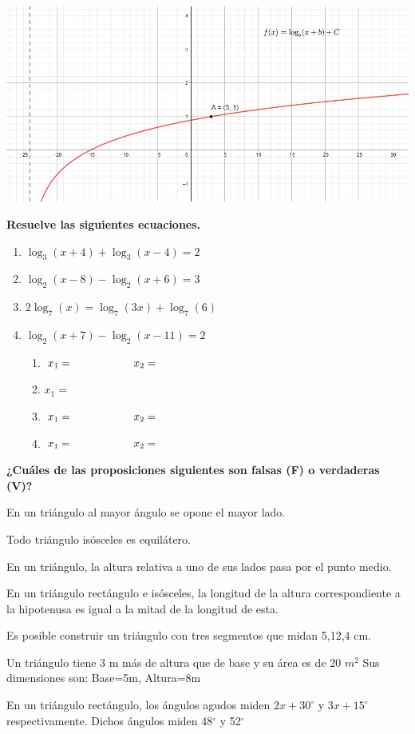 \documentclass[12pt, addpoints, answers]{exam}
\newcommand{\tf}[1]{\fillin[#1][0.25in]}
\begin{document}
\begin{questions}
\begin{center}
	\includegraphics[width=0.7\linewidth]{Figuras/fig13}
\end{center}
\vspace{0.5 cm}
\question[1]\textbf{Resuelve las siguientes ecuaciones.}
\begin{enumerate}
	\item $\log_3(x+4)+\log_3(x-4)=2$ %
	\item $\log_2(x-8)-\log_2(x+6)=3$ %
	\item $ 2\log_7(x)=\log_7(3x)+\log_7(6)$ %
	\item $ \log_2(x+7)-\log_2(x-11)=2$
	
	\begin{solution}
		\begin{enumerate}
			\item $x_{1}= \hspace{0.8in} x_{2}=$
			\item $x_{1}= $
				\item $x_{1}= \hspace{0.8in} x_{2}=$
					\item $x_{1}= \hspace{0.8in} x_{2}=$
		\end{enumerate}
	\end{solution}
\end{enumerate}
\question[1] \textbf{¿Cuáles de las proposiciones siguientes son falsas (F) o verdaderas (V)?}
 
\tf{} En un triángulo al mayor ángulo se opone el mayor lado.

\tf{} Todo triángulo isósceles es equilátero.

\tf{} En un triángulo, la altura relativa a uno de sus lados pasa por el punto medio.

\tf{} En un triángulo rectángulo e isósceles, la longitud de la altura correspondiente a la hipotenusa es igual a la mitad de la longitud de esta.

\tf{} Es posible construir un triángulo con tres segmentos que midan 5,12,4 cm. %

\tf{} Un triángulo tiene 3 m más de altura que de base y su área es de 20 $m^{2}$   Sus  dimensiones son: Base=5m, Altura=8m %

\tf{} En un triángulo rectángulo, los ángulos agudos miden $2x+30^\circ$ y $3x+15^\circ$ respectivamente. Dichos ángulos miden 48$^\circ$ y 52$^\circ$ %









\end{questions}	
\end{document}
